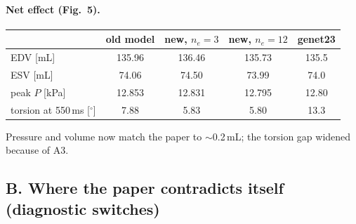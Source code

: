 \documentclass[10pt]{article}
\begin{document}
\paragraph{Net effect (Fig.~5).}
\begin{center}\begin{tabular}{lcccc}
\toprule & old model & new, $n_e{=}3$ & new, $n_e{=}12$ & genet23 \\ \midrule
EDV [mL] & 135.96 & 136.46 & 135.73 & 135.5 \\
ESV [mL] & 74.06 & 74.50 & 73.99 & 74.0 \\
peak $P$ [kPa] & 12.853 & 12.831 & 12.795 & 12.80 \\
torsion at 550\,ms [$^\circ$] & 7.88 & 5.83 & 5.80 & 13.3 \\ \bottomrule
\end{tabular}\end{center}
Pressure and volume now match the paper to $\sim$0.2\,mL; the torsion gap widened because of
A3.

\subsection*{B. Where the paper contradicts itself (diagnostic switches)}
\end{document}
